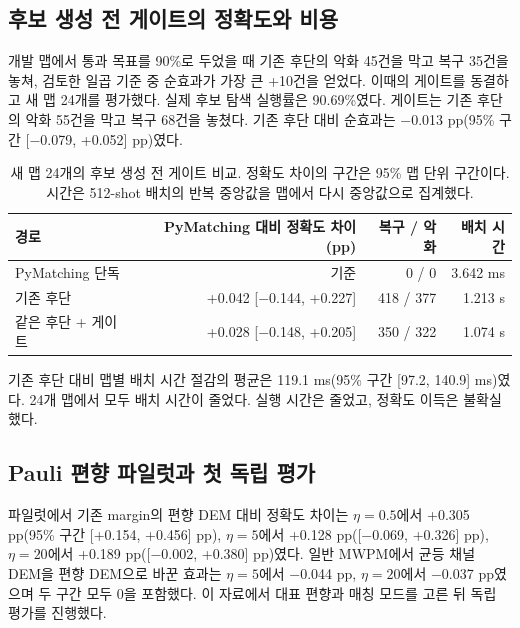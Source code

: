 \documentclass[aps,prd,12pt,twocolumn,superscriptaddress,floatfix]{revtex4-2}
\begin{document}
\subsection{후보 생성 전 게이트의 정확도와 비용}

개발 맵에서 통과 목표를 90\%로 두었을 때 기존 후단의 악화 45건을 막고 복구 35건을 놓쳐, 검토한 일곱 기준 중 순효과가 가장 큰 +10건을 얻었다. 이때의 게이트를 동결하고 새 맵 24개를 평가했다. 실제 후보 탐색 실행률은 90.69\%였다. 게이트는 기존 후단의 악화 55건을 막고 복구 68건을 놓쳤다. 기존 후단 대비 순효과는 \ensuremath{-}0.013 pp(95\% 구간 [\ensuremath{-}0.079, +0.052] pp)였다.

\begin{table}[tb]
\centering
\caption{새 맵 24개의 후보 생성 전 게이트 비교. 정확도 차이의 구간은 95\% 맵 단위 구간이다. 시간은 512-shot 배치의 반복 중앙값을 맵에서 다시 중앙값으로 집계했다.}
\label{tab:pre-gate}
\small
\begin{tabular}{@{}lrrr@{}}
\toprule
경로 & PyMatching 대비 정확도 차이 (pp) & 복구 / 악화 & 배치 시간 \\
\midrule
PyMatching 단독 & 기준 & 0 / 0 & 3.642 ms \\
기존 후단 & +0.042 [\ensuremath{-}0.144, +0.227] & 418 / 377 & 1.213 s \\
같은 후단 + 게이트 & +0.028 [\ensuremath{-}0.148, +0.205] & 350 / 322 & 1.074 s \\
\bottomrule
\end{tabular}
\end{table}

기존 후단 대비 맵별 배치 시간 절감의 평균은 119.1 ms(95\% 구간 [97.2, 140.9] ms)였다. 24개 맵에서 모두 배치 시간이 줄었다. 실행 시간은 줄었고, 정확도 이득은 불확실했다.

\subsection{Pauli 편향 파일럿과 첫 독립 평가}

파일럿에서 기존 margin의 편향 DEM 대비 정확도 차이는 \(\eta=0.5\)에서 +0.305 pp(95\% 구간 [+0.154, +0.456] pp), \(\eta=5\)에서 +0.128 pp([\ensuremath{-}0.069, +0.326] pp), \(\eta=20\)에서 +0.189 pp([\ensuremath{-}0.002, +0.380] pp)였다. 일반 MWPM에서 균등 채널 DEM을 편향 DEM으로 바꾼 효과는 \(\eta=5\)에서 \ensuremath{-}0.044 pp, \(\eta=20\)에서 \ensuremath{-}0.037 pp였으며 두 구간 모두 0을 포함했다. 이 자료에서 대표 편향과 매칭 모드를 고른 뒤 독립 평가를 진행했다.
\end{document}
